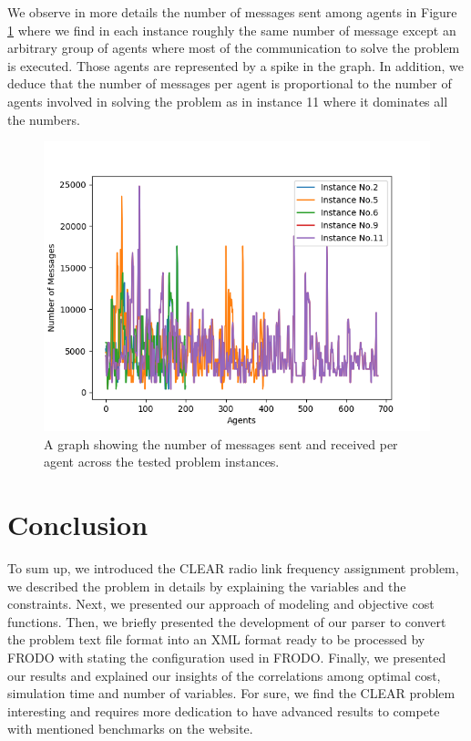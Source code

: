 \documentclass{article}
\begin{document}
	We observe in more details the number of messages sent among agents in Figure \ref{results:messages} where we find in each instance roughly the same number of message except an arbitrary group of agents where most of the communication to solve the problem is executed. Those agents are represented by a spike in the graph. In addition, we deduce that the number of messages per agent is proportional to the number of agents involved in solving the problem as in instance 11 where it dominates all the numbers.
	\begin{figure}
		\centering
		\includegraphics[scale=0.8]{figure/messages.png}
		\caption{A graph showing the number of messages sent and received per agent across the tested problem instances.}
		\label{results:messages}
	\end{figure}

	\section{Conclusion}
	To sum up, we introduced the CLEAR radio link frequency assignment problem, we described the problem in details by explaining the variables and the constraints. Next, we presented our approach of modeling and objective cost functions. Then, we briefly presented the development of our parser to convert the problem text file format into an XML format ready to be processed by FRODO with stating the configuration used in FRODO. Finally, we presented our results and explained our insights of the correlations among optimal cost, simulation time and number of variables. For sure, we find the CLEAR problem interesting and requires more dedication to have advanced results to compete with mentioned benchmarks on the website.
	\newpage
	
	
\end{document}
